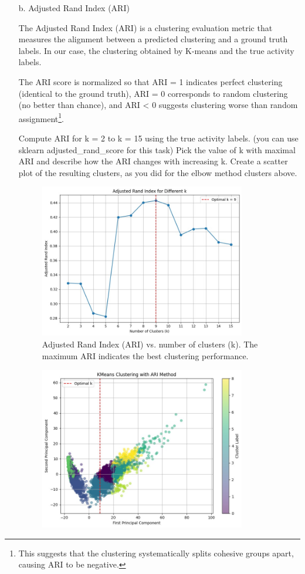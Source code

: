 \documentclass[a3paper,12pt]{extarticle} %
\begin{document}
\begin{enumerate}
\begin{itemize}
\item[b.] Adjusted Rand Index (ARI)

The Adjusted Rand Index (ARI) is a clustering evaluation metric that measures the alignment between a predicted clustering and a ground truth labels. In our case, the clustering obtained by K-means and the true activity labels.

The ARI score is normalized so that ARI = 1 indicates perfect clustering (identical to the ground truth), ARI = 0 corresponds to random clustering (no better than chance), and ARI < 0 suggests clustering worse than random assignment\footnote{This suggests that the clustering systematically splits cohesive groups apart, causing ARI to be negative.}.

Compute ARI for k = 2 to k = 15 using the true activity labels. (you can use sklearn adjusted\_rand\_score for this task) Pick the value of k with maximal ARI and describe how the ARI changes with increasing k. Create a scatter plot of the resulting clusters, as you did for the elbow method clusters above.
\begin{figure}[H]
    \centering
    \includegraphics[width=0.85\textwidth]{ari4.2.jpg}
    \caption{Adjusted Rand Index (ARI) vs. number of clusters (k). The maximum ARI indicates the best clustering performance.}
    \label{fig:ari-method}
\end{figure}
\begin{figure}[H]
    \centering
    \includegraphics[width=0.85\textwidth]{aricluster4.2.jpg}

\end{figure}
\end{itemize}
\end{enumerate}
\end{document}
